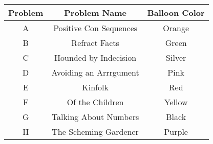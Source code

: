 \begin{center}
\begin{tabular}{|c|c|c|}
  \hline
{\bfseries Problem}&
{\bfseries Problem Name}&
{\bfseries Balloon Color}\\
\hline
\hline
A&
Positive Con Sequences &
Orange \\
\hline
B&
Refract Facts &
Green \\
\hline
C &
Hounded by Indecision &
Silver \\
\hline
D&
Avoiding an Arrrgument   &
Pink \\
\hline
E&
Kinfolk &
Red \\
\hline
F&
Of the Children &
Yellow \\
\hline
G&
Talking About Numbers &
Black \\
\hline
H &
The Scheming Gardener &
Purple \\
\hline
\end{tabular}
\end{center}

